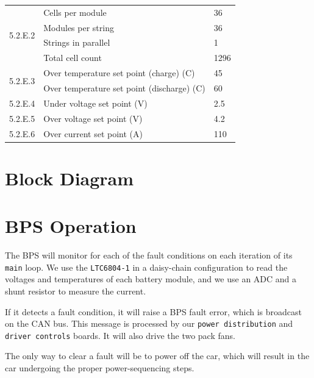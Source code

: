 \documentclass[10pt]{article}
\begin{document}
\begin{table}[!htbp]
\centering
\begin{tabular}{|l|l|l|}
\hline
\multirow{4}{*}{5.2.E.2} & Cells per module                           & 36   \\ \cline{2-3}
                         & Modules per string                         & 36   \\ \cline{2-3}
                         & Strings in parallel                        & 1    \\ \cline{2-3}
                         & Total cell count                           & 1296 \\ \hline
\multirow{2}{*}{5.2.E.3} & Over temperature set point (charge) (C)    & 45   \\ \cline{2-3}
                         & Over temperature set point (discharge) (C) & 60   \\ \hline
5.2.E.4                  & Under voltage set point (V)                & 2.5  \\ \hline
5.2.E.5                  & Over voltage set point (V)                 & 4.2  \\ \hline
5.2.E.6                  & Over current set point (A)                 & 110  \\ \hline
\end{tabular}
\end{table}

\section{Block Diagram}


\section{BPS Operation}

The BPS will monitor for each of the fault conditions on each iteration of its
\texttt{main} loop. We use the \texttt{LTC6804-1} in a daisy-chain
configuration to read the voltages and temperatures of each battery module, and
we use an ADC and a shunt resistor to measure the current.

If it detects a fault condition, it will raise a BPS fault error, which is
broadcast on the CAN bus. This message is processed by our
\texttt{power distribution} and \texttt{driver controls} boards. It will also
drive the two pack fans.

The only way to clear a fault will be to power off the car, which will result
in the car undergoing the proper power-sequencing steps.
\end{document}

